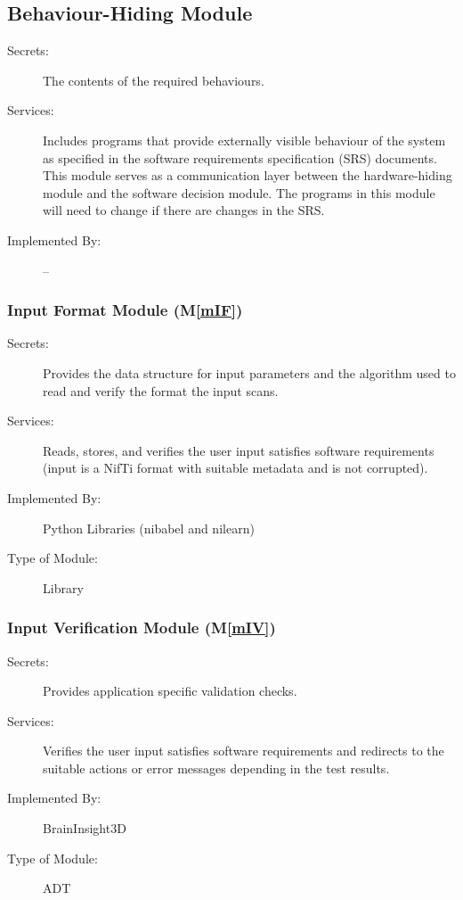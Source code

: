 \documentclass[12pt, titlepage]{article}
\newcommand{\mref}[1]{M\ref{#1}}
\begin{document}
\subsection{Behaviour-Hiding Module}

\begin{description}
  \item[Secrets:]The contents of the required behaviours.
  \item[Services:]Includes programs that provide externally visible behaviour of
        the system as specified in the software requirements specification (SRS)
        documents. This module serves as a communication layer between the
        hardware-hiding module and the software decision module. The programs in this
        module will need to change if there are changes in the SRS.
  \item[Implemented By:] --
\end{description}

\subsubsection{Input Format Module (\mref{mIF})}

\begin{description}
  \item[Secrets:]Provides the data structure for input parameters and the algorithm used to read and verify the format the input scans.
  \item[Services:]Reads, stores, and verifies the user input satisfies software requirements (input is a NifTi format with suitable metadata and is not corrupted).

  \item[Implemented By:] Python Libraries (nibabel and nilearn)
  \item[Type of Module:] Library
\end{description}



\subsubsection{Input Verification Module (\mref{mIV})}

\begin{description}
  \item[Secrets:] Provides application specific validation checks.
  \item[Services:]Verifies the user input satisfies software requirements and redirects to the suitable
        actions or error messages depending in the test results.
  \item[Implemented By:] BrainInsight3D
  \item[Type of Module:] ADT
\end{description}
\end{document}
